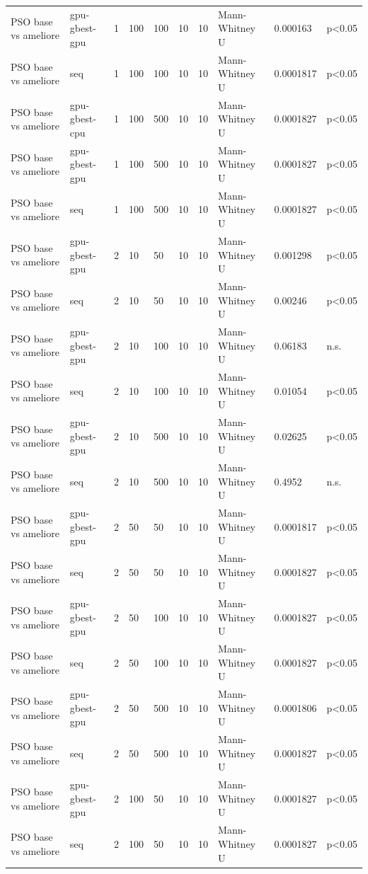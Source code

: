 \begin{table}[t]
\begin{tabular}{llllllllll}
PSO base vs ameliore & gpu-gbest-gpu & 1 & 100 & 100 & 10 & 10 & Mann-Whitney U & 0.000163 & p<0.05 \\
PSO base vs ameliore & seq & 1 & 100 & 100 & 10 & 10 & Mann-Whitney U & 0.0001817 & p<0.05 \\
PSO base vs ameliore & gpu-gbest-cpu & 1 & 100 & 500 & 10 & 10 & Mann-Whitney U & 0.0001827 & p<0.05 \\
PSO base vs ameliore & gpu-gbest-gpu & 1 & 100 & 500 & 10 & 10 & Mann-Whitney U & 0.0001827 & p<0.05 \\
PSO base vs ameliore & seq & 1 & 100 & 500 & 10 & 10 & Mann-Whitney U & 0.0001827 & p<0.05 \\
PSO base vs ameliore & gpu-gbest-gpu & 2 & 10 & 50 & 10 & 10 & Mann-Whitney U & 0.001298 & p<0.05 \\
PSO base vs ameliore & seq & 2 & 10 & 50 & 10 & 10 & Mann-Whitney U & 0.00246 & p<0.05 \\
PSO base vs ameliore & gpu-gbest-gpu & 2 & 10 & 100 & 10 & 10 & Mann-Whitney U & 0.06183 & n.s. \\
PSO base vs ameliore & seq & 2 & 10 & 100 & 10 & 10 & Mann-Whitney U & 0.01054 & p<0.05 \\
PSO base vs ameliore & gpu-gbest-gpu & 2 & 10 & 500 & 10 & 10 & Mann-Whitney U & 0.02625 & p<0.05 \\
PSO base vs ameliore & seq & 2 & 10 & 500 & 10 & 10 & Mann-Whitney U & 0.4952 & n.s. \\
PSO base vs ameliore & gpu-gbest-gpu & 2 & 50 & 50 & 10 & 10 & Mann-Whitney U & 0.0001817 & p<0.05 \\
PSO base vs ameliore & seq & 2 & 50 & 50 & 10 & 10 & Mann-Whitney U & 0.0001827 & p<0.05 \\
PSO base vs ameliore & gpu-gbest-gpu & 2 & 50 & 100 & 10 & 10 & Mann-Whitney U & 0.0001827 & p<0.05 \\
PSO base vs ameliore & seq & 2 & 50 & 100 & 10 & 10 & Mann-Whitney U & 0.0001827 & p<0.05 \\
PSO base vs ameliore & gpu-gbest-gpu & 2 & 50 & 500 & 10 & 10 & Mann-Whitney U & 0.0001806 & p<0.05 \\
PSO base vs ameliore & seq & 2 & 50 & 500 & 10 & 10 & Mann-Whitney U & 0.0001827 & p<0.05 \\
PSO base vs ameliore & gpu-gbest-gpu & 2 & 100 & 50 & 10 & 10 & Mann-Whitney U & 0.0001827 & p<0.05 \\
PSO base vs ameliore & seq & 2 & 100 & 50 & 10 & 10 & Mann-Whitney U & 0.0001827 & p<0.05 \\

\end{tabular}
\end{table}
